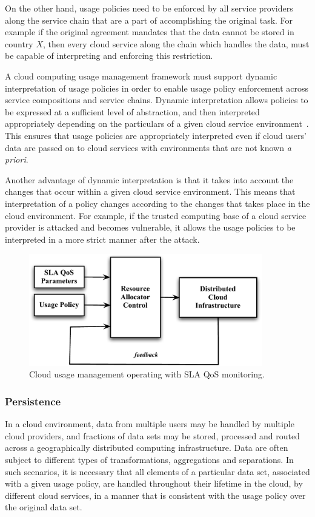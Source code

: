 \documentclass[notitlepage]{book}
\begin{document}
\begin{doublespace}
On the other hand, usage policies need to be enforced by all service providers along the service chain that are a part of accomplishing the original task. For example if the original agreement mandates that the data cannot be stored in country $X$, then every cloud service along the chain which handles the data, must be capable of interpreting and enforcing this restriction. 

A cloud computing usage management framework must support dynamic interpretation of usage policies in order to enable usage policy enforcement across  service compositions and service chains. Dynamic interpretation allows policies to be expressed at a sufficient level of abstraction, and then interpreted appropriately depending on the particulars of a given cloud service environment~\cite{JaHeLa:10}. This ensures that usage policies are appropriately interpreted even if cloud users' data are passed on to cloud services with environments that are not known {\it a priori}. 

Another advantage of dynamic interpretation is that it takes into account the changes that occur within a given cloud service environment. This means that interpretation of a policy changes according to the changes that takes place in the cloud environment. For example, if the trusted computing base of a cloud service provider is attacked and becomes vulnerable, it allows the usage policies to be interpreted in a more strict manner after the attack. 

\begin{figure}[t]
\centering
\includegraphics[width=4in]{sla-usage}
\caption{Cloud usage management operating with SLA QoS monitoring.}
\label{fig:sla-usage}
\end{figure}

\subsubsection {Persistence}
In a cloud environment, data from multiple users may be handled by multiple cloud providers, and fractions of data sets may be stored, processed and routed across a geographically distributed computing infrastructure. Data are often subject to different types of transformations, aggregations and separations.  In such scenarios, it is necessary that all elements of a particular data set, associated with a given usage policy, are handled throughout their lifetime in the cloud, by different cloud services, in a manner that is consistent with the usage policy over the original data set. 


\end{doublespace}
\end{document}
